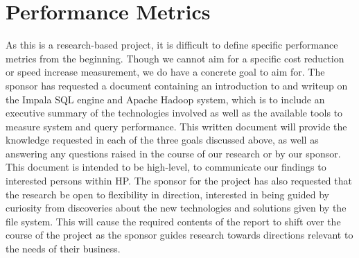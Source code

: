 \documentclass[onecolumn, draftclsnofoot,10pt, compsoc]{IEEEtran}
\begin{document}
\section{Performance Metrics}
\indent As this is a research-based project, it is difficult to define specific performance metrics from the beginning. Though we cannot aim for a specific cost reduction or speed increase measurement, we do have a concrete goal to aim for. The sponsor has requested a document containing an introduction to and writeup on the Impala SQL engine and Apache Hadoop system, which is to include an executive summary of the technologies involved as well as the available tools to measure system and query performance. 
\indent This written document will provide the knowledge requested in each of the three goals discussed above, as well as answering any questions raised in the course of our research or by our sponsor. This document is intended to be high-level, to communicate our findings to interested persons within HP. 
\indent The sponsor for the project has also requested that the research be open to flexibility in direction, interested in being guided by curiosity from discoveries about the new technologies and solutions given by the file system. This will cause the required contents of the report to shift over the course of the project as the sponsor guides research towards directions relevant to the needs of their business. 
\end{document}
